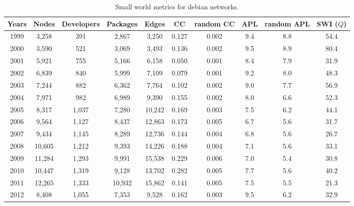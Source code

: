 \begin{table}[H]
\begin{center}
\begin{tabular}{|c|c|c|c|c|c|c|c|c|c|}
\hline
Years&Nodes&Developers&Packages&Edges&CC&random CC&APL&random APL&SWI ($Q$)\\
\hline
1999&3,258&391&2,867&3,250&0.127&0.002&9.4&8.8&54.4\\
2000&3,590&521&3,069&3,493&0.136&0.002&9.5&8.9&80.4\\
2001&5,921&755&5,166&6,158&0.050&0.001&8.4&7.9&31.9\\
2002&6,839&840&5,999&7,109&0.079&0.001&9.2&8.0&48.3\\
2003&7,244&882&6,362&7,764&0.102&0.002&9.0&7.7&56.9\\
2004&7,971&982&6,989&9,390&0.155&0.002&8.0&6.6&52.3\\
2005&8,317&1,037&7,280&10,242&0.169&0.003&7.5&6.2&44.1\\
2006&9,564&1,127&8,437&12,863&0.173&0.005&6.7&5.6&31.7\\
2007&9,434&1,145&8,289&12,736&0.144&0.004&6.8&5.6&26.7\\
2008&10,605&1,212&9,393&14,226&0.188&0.004&7.1&5.6&33.1\\
2009&11,284&1,293&9,991&15,538&0.229&0.006&7.0&5.4&30.8\\
2010&10,447&1,319&9,128&13,702&0.282&0.005&7.7&5.6&40.2\\
2011&12,265&1,333&10,932&15,862&0.141&0.005&7.5&5.5&21.3\\
2012&8,408&1,055&7,353&9,528&0.162&0.003&9.5&6.2&32.9\\
\hline
\end{tabular}
\caption{Small world metrics for debian networks.}
\label{swi_debian}
\end{center}
\end{table}

